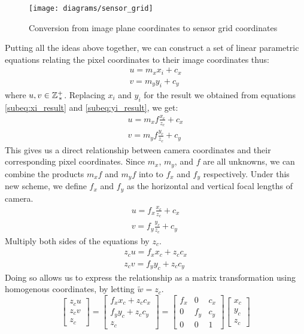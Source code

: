 \begin{figure}[H]
    \centering
    \texttt{[image: diagrams/sensor\_grid]}
    \caption{Conversion from image plane coordinates to sensor grid coordinates}
\end{figure}
Putting all the ideas above together, we can construct a set of linear parametric equations relating the pixel coordinates to their image coordinates thus:
\begin{align*}
    u = m_x x_i + c_x \\
    v = m_y y_i + c_y
\end{align*}
where $u,v \in \mathbb{Z}^+_{\,*}$. Replacing $x_i$ and $y_i$ for the result we obtained from equations \ref{subeq:xi_result} and \ref{subeq:yi_result}, we get:
\begin{align*}
    u = m_x f \frac{x_c}{z_c} + c_x \\
    v = m_y f \frac{y_c}{z_c} + c_y
\end{align*}
This gives us a direct relationship between camera coordinates and their corresponding pixel coordinates. Since $m_x$, $m_y$, and $f$ are all unknowns, we can combine the products $m_x f$ and $m_y f$ into to $f_x$ and $f_y$ respectively. Under this new scheme, we define $f_x$ and $f_y$ as the horizontal and vertical focal lengths of camera.
\begin{gather}
    u = f_x \frac{x_c}{z_c} + c_x \\
    v = f_y \frac{y_c}{z_c} + c_y
\end{gather}
Multiply both sides of the equations by $z_c$.
\begin{subequations}
    \begin{gather*}
        z_c u = f_x x_c + z_c c_x \\
        z_c v = f_y y_c + z_c c_y
    \end{gather*}
\end{subequations}
Doing so allows us to express the relationship as a matrix transformation using homogenous coordinates, by letting $\widetilde{w} = z_c$.
\begin{equation}
    \begin{bmatrix}
        z_c u \\ z_c v \\ z_c
    \end{bmatrix}
    =
    \begin{bmatrix}
        f_x x_c + z_c c_x \\ f_y y_c + z_c c_y \\ z_c
    \end{bmatrix}
    =
    \begin{bmatrix}
        f_x & 0   & c_x \\
        0   & f_y & c_y \\
        0   & 0   & 1
    \end{bmatrix}
    \begin{bmatrix}
        x_c \\ y_c \\ z_c
    \end{bmatrix}
\end{equation}
